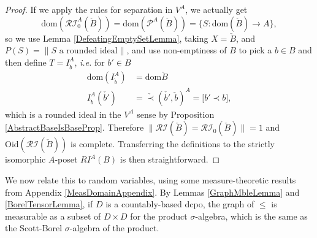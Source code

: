 \documentclass{lmcs}
\newcommand{\dom}{\ensuremath{\mathrm{dom}}}
\newcommand{\powerset}{\ensuremath{\mathcal{P}}}
\newcommand{\apowerset}{\powerset^A}
\newcommand{\Oid}{\mathrm{Oid}}
\newcommand{\iver}[1]{{\pmb{[}#1\pmb{]}}} %
\newcommand{\RI}{\mathcal{RI}} %
\newcommand{\bvs}[1]{\| {#1} \|}
\begin{document}
\begin{proof}
If we apply the rules for separation in $V^A$, we actually get
\[
\dom(\RI_0^A(\check{B})) = \dom(\apowerset(\check{B})) = \{ S : \dom(\check{B}) \rightarrow A \},
\]
so we use Lemma \ref{DefeatingEmptySetLemma}, taking $X = \check{B}$, and $P(S) = \bvs{S \text{ a rounded ideal}}$, and use non-emptiness of $B$ to pick a $b \in B$ and then define $T = I_{\check{b}}^A$, \emph{i.e.} for $b' \in B$
\begin{align*}
\dom(I^A_{\check{b}}) &= \dom{\check{B}} \\
I_{\check{b}}^A(\check{b'}) &= \check{\prec}(\check{b'},\check{b})^A = \iver{b' \prec b},
\end{align*}
which is a rounded ideal in the $V^A$ sense by Proposition \ref{AbstractBaseIsBaseProp}. Therefore $\bvs{\RI(\check{B}) = \RI_0(\check{B})} = 1$ and $\Oid(\RI(\check{B}))$ is complete. Transferring the definitions to the strictly isomorphic $A$-poset $RI^A(B)$ is then straightforward. 
\end{proof}

We now relate this to random variables, using some measure-theoretic results from Appendix \ref{MeasDomainAppendix}. By Lemmas \ref{GraphMbleLemma} and \ref{BorelTensorLemma}, if $D$ is a countably-based dcpo, the graph of ${\leq}$ is measurable as a subset of $D \times D$ for the product $\sigma$-algebra, which is the same as the Scott-Borel $\sigma$-algebra of the product. 
\end{document}
